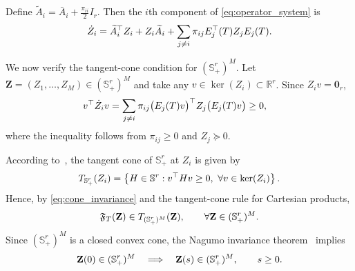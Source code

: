 \documentclass[conference]{IEEEtran}
\begin{document}
\begin{IEEEproof}
		Define
		$
		\widetilde A_i
		=
		\bar A_i+\frac{\pi_{ii}}{2}I_r.
		$
		Then the $i$th component of
		\eqref{eq:operator_system} is
		\vspace{-0.2\baselineskip}
		\begin{equation}
			\dot Z_i
			=
			\widetilde A_i^\top Z_i
			+
			Z_i\widetilde A_i
			+
			\sum_{j\ne i}
			\pi_{ij}
			E_j^\top(T)Z_jE_j(T).			
			\label{eq:positive_operator_component}
			\vspace{-0.2\baselineskip}
		\end{equation}
		
		We now verify the tangent-cone condition for
		$(\mathbb S_+^r)^M$. Let
		$
		\mathbf Z=(Z_1,\ldots,Z_M)
		\in(\mathbb S_+^r)^M
		$
		and take any $v\in\ker(Z_i)\subset\mathbb R^r$. Since $Z_iv=\mathbf 0_r$,
		\vspace{-0.2\baselineskip}
		\begin{align}
			v^\top\dot Z_iv
			&=
			\sum_{j\ne i}
			\pi_{ij}
			\bigl(E_j(T)v\bigr)^\top
			Z_j
			\bigl(E_j(T)v\bigr)\geq0,			
			\label{eq:cone_invariance}
			\vspace{-0.2\baselineskip}
		\end{align}
		where the inequality follows from
		$\pi_{ij}\geq0$ and $Z_j\succeq0$.
		
		According to~\cite{hiriart2012}, the tangent cone of $\mathbb S_+^r$ at $Z_i$ is given by
		\vspace{-0.2\baselineskip}	
		\[
		T_{\mathbb S_+^r}(Z_i)
		=
		\left\{
		H\in\mathbb S^r:
		v^\top Hv\geq0,\
		\forall v\in\ker(Z_i)
		\right\}.	
		\vspace{-0.2\baselineskip}	
		\]
		Hence, by \eqref{eq:cone_invariance} and the tangent-cone rule
		for Cartesian products,
		\vspace{-0.2\baselineskip}
		\[
		\mathfrak F_T(\mathbf Z)
		\in
		T_{(\mathbb S_+^r)^M}(\mathbf Z),
		\qquad
		\forall\mathbf Z\in(\mathbb S_+^r)^M.	
		\vspace{-0.2\baselineskip}	
		\]
		Since $(\mathbb S_+^r)^M$ is a closed convex cone, the Nagumo
		invariance theorem~\cite{nagumo1942} implies
		\vspace{-0.2\baselineskip}
		\[
		\mathbf Z(0)\in(\mathbb S_+^r)^M
		\quad\Longrightarrow\quad
		\mathbf Z(s)\in(\mathbb S_+^r)^M,
		\qquad s\geq0.	
		\vspace{-0.2\baselineskip}
		\]
		

\end{IEEEproof}
\end{document}
